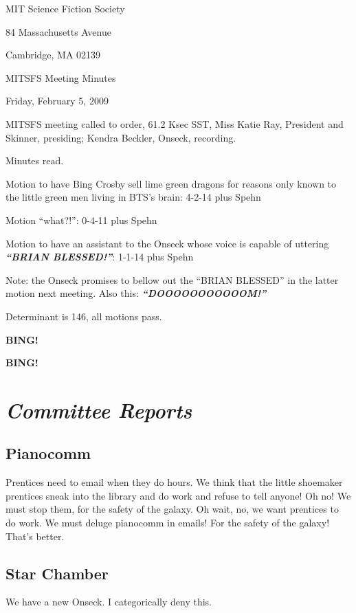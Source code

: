 \documentclass[10pt]{article}
\newcommand{\bing}{{\bf BING!} }
\newcommand{\goto}[1]{\bing \vskip 12pt \section*{{\em{#1}}}}
\newcommand{\ps}{ plus Spehn\xspace}
\newcommand{\skinner}{Miss Katie Ray, President and Skinner}
\newcommand{\onseck}{Kendra Beckler, Onseck}
\newcommand{\meetingdate}{Friday, February 5, 2009}
\begin{document}
\begin{center}

MIT Science Fiction Society

84 Massachusetts Avenue

Cambridge, MA 02139

\vspace{12pt}

MITSFS Meeting Minutes

\meetingdate

\end{center}

\vspace{18pt}

\setlength{\parskip}{6pt}

\noindent
MITSFS meeting called to order, 61.2 Ksec SST,
\skinner, presiding; \onseck, recording.

Minutes read.

Motion to have Bing Crosby sell lime green dragons for reasons only known to the little green men living in BTS's brain: 4-2-14 \ps

Motion ``what?!'': 0-4-11 \ps

Motion to have an assistant to the Onseck whose voice is capable of uttering \textit{\textbf{``BRIAN BLESSED!''}}: 1-1-14 \ps

Note: the Onseck promises to bellow out the ``BRIAN BLESSED'' in the latter motion next meeting.  Also this: \textit{\textbf{``DOOOOOOOOOOOM!''}}

Determinant is 146, all motions pass.

\bing

\goto{Committee Reports}

\subsection*{Pianocomm}

Prentices need to email when they do hours.  We think that the little shoemaker prentices sneak into the library and do work and refuse to tell anyone!  Oh no!  We must stop them, for the safety of the galaxy.  Oh wait, no, we want prentices to do work.  We must deluge pianocomm in emails!  For the safety of the galaxy!  That's better.

\subsection*{Star Chamber}

We have a new Onseck.  I categorically deny this.
\end{document}
